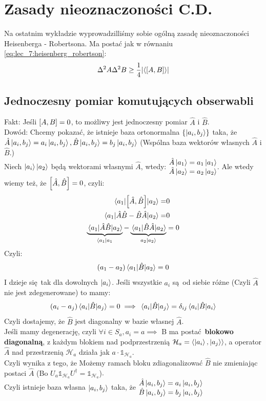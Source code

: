 \documentclass[12pt,a4paper]{report}
\newcommand{\HS}{\mathcal{H}}
\newcommand{\Id}{\mathbb{1}}
\renewcommand{\emph}{\textbf}
\newenvironment{lecture}[1]{\par\medskip
   \noindent\chapter{#1} \rmfamily}{\medskip}
\begin{document}
\begin{lecture}{Zasady nieoznaczoności C.D.}
    Na ostatnim wykładzie wyprowadzilliśmy sobie ogólną zasadę nieoznaczoności Heisenberga - Robertsona. Ma postać jak w równaniu \eqref{eq:lec_7:heisenberg_robertson}:
    \[
        \Delta^2 A \Delta^2 B \geq \frac14 \qty|\ev{\comm{A}{B}}|
    \]
    \section{Jednoczesny pomiar komutujących obserwabli}
    {\color{Orange} Fakt:} Jeśli $\comm{A}{B} = 0$, to możliwy jest jednoczesny pomiar $\hat{A}$ i $\hat{B}$.\\
    {\color{Emerald} Dowód:} Chcemy pokazać, że istnieje baza ortonormalna $\qty{\ket{a_i, b_j}}$ taka, że $\hat{A}\ket{a_i, b_j} = a_i \ket{a_i, b_j}, \hat{B} \ket{a_i, b_j} = b_j \ket{a_i, b_j}$ (Wspólna baza wektorów własnych $\hat{A}$ i $\hat{B}$.)\\
    Niech $\ket{a_i} \ket{a_2}$ będą wektorami własnymi $\hat{A}$, wtedy: $\mqty{\hat{A} \ket{a_1} = a_1 \ket{a_1} \\
    \hat{A} \ket{a_2} = a_2 \ket{a_2}}$. Ale wtedy wiemy też, że $\comm{\hat{A}}{\hat{B}} = 0$, czyli:
    \begin{align*}
        \mel{a_1}{\comm{\hat{A}}{\hat{B}}}{a_2} =& 0\\
        \mel{a_1}{\hat{A}\hat{B} - \hat{B}\hat{A}}{a_2} =& 0\\
        \underbrace{\mel{a_1}{\hat{A}\hat{B}}{a_2}}_{\bra{a_1}a_1} - \underbrace{\mel{a_1}{\hat{B}\hat{A}}{a_2}}_{a_2\ket{a_2}} &= 0
    \end{align*}
    Czyli:
    \[
        (a_1 - a_2)\mel{a_1}{\hat{B}}{a_2} = 0
    \]
    I dzieje się tak dla dowolnych $\ket{a_i}$. Jeśli wszystkie $a_i$ są od siebie różne (Czyli $\hat{A}$ nie jest zdegenerowane) to mamy:
    \[
        (a_i - a_j) \mel{a_i}{\hat{B}}{a_j} = 0 \implies \mel{a_i}{\hat{B}}{a_j} = \delta_{ij}\mel{a_i}{\hat{B}}{a_i}
    \]
    Czyli dostajemy, że $\hat{B}$ jest diagonalny w bazie własnej $\hat{A}$.\\
    Jeśli mamy degenerację, czyli $\forall i \in S_a, a_i = a \implies$ {\color{WildStrawberry} B ma postać \emph{blokowo diagonalną}, z każdym blokiem nad podprzestrzenią $\HS_a = \ev{\ket{a_i}, \ket{a_j}}$, a operator $\hat{A}$ nad przestrzenią $\HS_a$ działa jak $a \cdot \Id_{\HS_a}$.}\\
    Czyli wynika z tego, że {\color{Plum} Możemy ramach bloku zdiagonalizować $\hat{B}$ nie zmieniając postaci $\hat{A}$ (Bo $U_a \Id_{\HS_a} U^\dagger = \Id_{\HS_a}$)}.\\
    Czyli istnieje baza własna $\ket{a_i, b_j}$ taka, że $\mqty{
    \hat{A}\ket{a_i, b_j} = a_i \ket{a_i, b_j}\\
    \hat{B}\ket{a_i, b_j} = b_j \ket{a_i, b_j}}$ 
    

\end{lecture}
\end{document}
